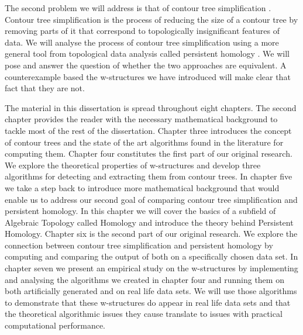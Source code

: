 The second problem we will address is that of contour tree simplification \cite{ct-branch-decomp}. Contour tree simplification is the process of reducing the size of a contour tree by removing parts of it that correspond to topologically insignificant  features of data. We will analyse the process of contour tree simplification using a more general tool from topological data analysis called persistent homology \cite{ph-a-survey}. We will pose and answer the question of whether the two approaches are equivalent. A counterexample based the w-structures we have introduced will make clear that fact that they are not.


The material in this dissertation is spread throughout eight chapters. The second chapter provides the reader with the necessary mathematical background to tackle most of the rest of the dissertation. Chapter three introduces the concept of contour trees and the state of the art algorithms found in the literature for computing them. Chapter four constitutes the first part of our original research. We explore the theoretical properties of w-structures and develop three algorithms for detecting and extracting them from contour trees. In chapter five we take a step back to introduce more mathematical background that would enable us to address our second goal of comparing contour tree simplification and persistent homology. In this chapter we will cover the basics of a subfield of Algebraic Topology called Homology and introduce the theory behind Persistent Homology. Chapter six is the second part of our original research. We explore the connection between contour tree simplification and persistent homology by computing and comparing the output of both on a specifically chosen data set. In chapter seven we present an empirical study on the w-structures by implementing and analysing the algorithms we created in chapter four and running them on both artificially generated and on real life data sets. We will use those algorithms to demonstrate that these w-structures do appear in real life data sets and that the theoretical algorithmic issues they cause translate to issues with practical computational performance.
